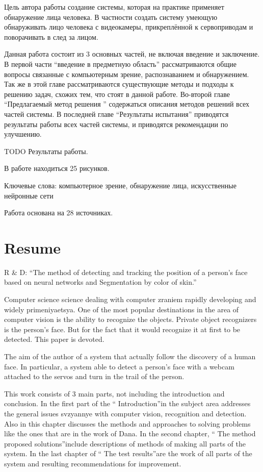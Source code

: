 \documentclass[12pt]{report}
\begin{document}
Цель автора работы создание системы, которая на практике применяет обнаружение лица человека. В частности создать 
систему умеющую обнаруживать лицо человека с видеокамеры, прикреплённой к сервоприводам и поворачивать в след за 
лицом.

Данная работа состоит из 3 основных частей, не включая введение и заключение. В первой части ``введение в 
предметную область'' рассматриваются общие вопросы связанные с компьютерным зрение, распознаванием и обнаружением. 
Так же в этой главе рассматриваются существующие методы и подходы к решению задач, схожих тем, что стоят в данной 
работе. Во-второй главе ``Предлагаемый метод решения '' содержаться описания методов решений всех частей системы. В 
последней главе ``Результаты испытания'' приводятся результаты работы всех частей системы, и приводятся 
рекомендации по улучшению.

TODO Результаты работы.

В работе находиться 25 рисунков.

Ключевые слова: компьютерное зрение, обнаружение лица, искусственные нейронные сети

Работа основана на 28 источниках.

\chapter*{Resume}
\thispagestyle{fancy}

R \& D: ``The method of detecting and tracking the position of a person's face based on neural networks and
Segmentation by color of skin.''

Computer science science dealing with computer zraniem rapidly developing and widely primeniyaetsya. One of the 
most popular destinations in the area of ​​computer vision is the ability to recognize the objects. Private object 
recognizers is the person's face. But for the fact that it would recognize it at first to be detected. This paper 
is devoted.

The aim of the author of a system that actually follow the discovery of a human face. In particular, a system able 
to detect a person's face with a webcam attached to the servos and turn in the trail of the person.

This work consists of 3 main parts, not including the introduction and conclusion. In the first part of the `` 
Introduction''in the subject area addresses the general issues svzyannye with computer vision, recognition and 
detection. Also in this chapter discusses the methods and approaches to solving problems like the ones that are in 
the work of Dana. In the second chapter, `` The method proposed solutions''include descriptions of methods of 
making all parts of the system. In the last chapter of `` The test results''are the work of all parts of the system 
and resulting recommendations for improvement.
\end{document}
